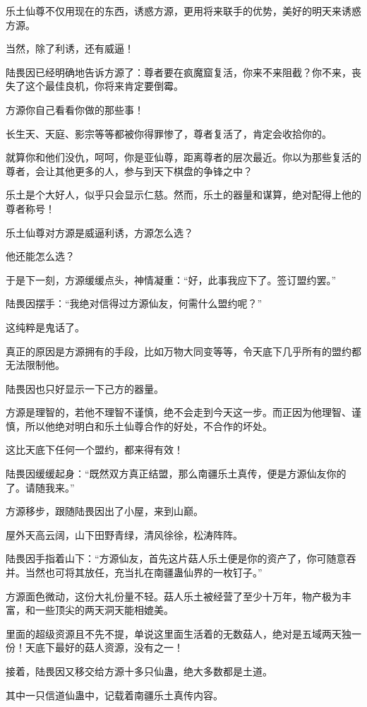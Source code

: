 \begin{this_body}
乐土仙尊不仅用现在的东西，诱惑方源，更用将来联手的优势，美好的明天来诱惑方源。

当然，除了利诱，还有威逼！

陆畏因已经明确地告诉方源了：尊者要在疯魔窟复活，你来不来阻截？你不来，丧失了这个最佳良机，你将来肯定要倒霉。

方源你自己看看你做的那些事！

长生天、天庭、影宗等等都被你得罪惨了，尊者复活了，肯定会收拾你的。

就算你和他们没仇，呵呵，你是亚仙尊，距离尊者的层次最近。你以为那些复活的尊者，会让其他更多的人，参与到天下棋盘的争锋之中？

乐土是个大好人，似乎只会显示仁慈。然而，乐土的器量和谋算，绝对配得上他的尊者称号！

乐土仙尊对方源是威逼利诱，方源怎么选？

他还能怎么选？

于是下一刻，方源缓缓点头，神情凝重：“好，此事我应下了。签订盟约罢。”

陆畏因摆手：“我绝对信得过方源仙友，何需什么盟约呢？”

这纯粹是鬼话了。

真正的原因是方源拥有的手段，比如万物大同变等等，令天底下几乎所有的盟约都无法限制他。

陆畏因也只好显示一下己方的器量。

方源是理智的，若他不理智不谨慎，绝不会走到今天这一步。而正因为他理智、谨慎，所以他绝对明白和乐土仙尊合作的好处，不合作的坏处。

这比天底下任何一个盟约，都来得有效！

陆畏因缓缓起身：“既然双方真正结盟，那么南疆乐土真传，便是方源仙友你的了。请随我来。”

方源移步，跟随陆畏因出了小屋，来到山巅。

屋外天高云阔，山下田野青绿，清风徐徐，松涛阵阵。

陆畏因手指着山下：“方源仙友，首先这片菇人乐土便是你的资产了，你可随意吞并。当然也可将其放任，充当扎在南疆蛊仙界的一枚钉子。”

方源面色微动，这份大礼份量不轻。菇人乐土被经营了至少十万年，物产极为丰富，和一些顶尖的两天洞天能相媲美。

里面的超级资源且不先不提，单说这里面生活着的无数菇人，绝对是五域两天独一份！天底下最好的菇人资源，没有之一！

接着，陆畏因又移交给方源十多只仙蛊，绝大多数都是土道。

其中一只信道仙蛊中，记载着南疆乐土真传内容。


\end{this_body}
